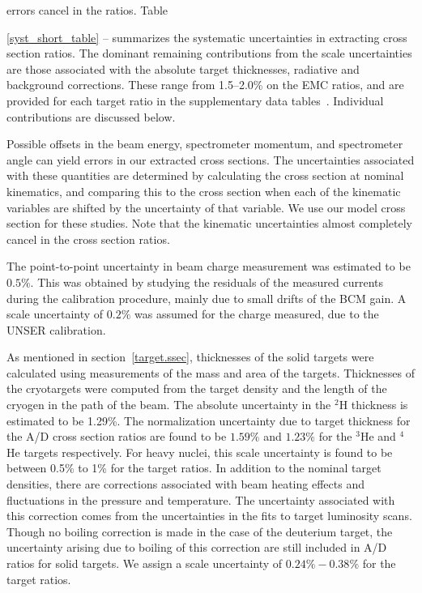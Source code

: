 errors cancel in the ratios. Table~{\ref{syst_short_table} -- summarizes the
systematic uncertainties in extracting cross section ratios. The dominant
remaining contributions from the scale uncertainties are those associated with
the absolute target thicknesses, radiative and background corrections.  These
range from 1.5--2.0\% on the EMC ratios, and are provided for each target
ratio in the supplementary data tables~\cite{online_material}. Individual
contributions are discussed below.

Possible offsets in the beam energy, spectrometer momentum, and spectrometer
angle can yield errors in our extracted cross sections. The uncertainties
associated with these quantities are determined by calculating the cross
section at nominal kinematics, and comparing this to the cross section when
each of the kinematic variables are shifted by the uncertainty of that
variable. We use our model cross section for these studies. Note that the
kinematic uncertainties almost completely cancel in the cross section ratios.

The point-to-point uncertainty in beam charge measurement was estimated to
be $0.5\%$. This was obtained by studying the residuals of the measured
currents during the calibration procedure, mainly due to small drifts of the
BCM gain.  A scale uncertainty of $0.2\%$ was assumed for the charge measured,
due to the UNSER calibration.


As mentioned in section~\ref{target.ssec}, thicknesses of the solid targets
were calculated using measurements of the mass and area of the targets.
Thicknesses of the cryotargets were computed from the target density and the
length of the cryogen in the path of the beam. The absolute uncertainty in the
$^2$H thickness is estimated to be 1.29\%. The normalization uncertainty due
to target thickness for the A/D cross section ratios are found to be $1.59\%$
and $1.23\%$ for the $^3$He and $^4$He targets respectively. For heavy nuclei,
this scale uncertainty is found to be between 0.5\% to 1\% for the target
ratios.  In addition to the nominal target densities, there are corrections 
associated with beam heating effects and fluctuations in the pressure and
temperature. The uncertainty associated with this correction comes from the
uncertainties in the fits to target luminosity scans. Though no boiling
correction is made in the case of the deuterium target, the uncertainty
arising due to boiling of this correction are still included in A/D ratios
for solid targets.  We assign a scale uncertainty of $0.24\% - 0.38\%$ for
the target ratios.

}
